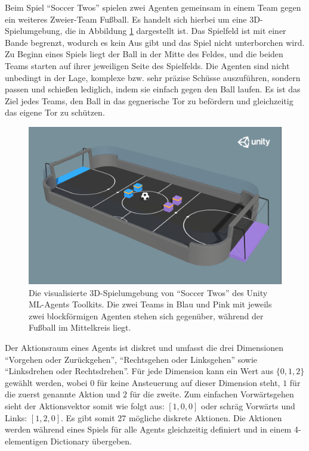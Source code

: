 Beim Spiel ``Soccer Twos'' spielen zwei Agenten gemeinsam in einem Team gegen ein weiteres Zweier-Team Fußball. Es handelt sich hierbei um eine 3D-Spielumgebung, die in Abbildung \ref{fig:soccer_twos_3d} dargestellt ist. Das Spielfeld ist mit einer Bande begrenzt, wodurch es kein Aus gibt und das Spiel nicht unterborchen wird. Zu Beginn eines Spiels liegt der Ball in der Mitte des Feldes, und die beiden Teams starten auf ihrer jeweiligen Seite des Spielfelds. Die Agenten sind nicht unbedingt in der Lage, komplexe bzw. sehr präzise Schüsse auszuführen, sondern passen und schießen lediglich, indem sie einfach gegen den Ball laufen. Es ist das Ziel jedes Teams, den Ball in das gegnerische Tor zu befördern und gleichzeitig das eigene Tor zu schützen.

\begin{figure}[h]
	\centering
	\includegraphics[width=\textwidth]{img/soccer_twos.png}
	\caption{Die visualisierte 3D-Spielumgebung von ``Soccer Twos'' des Unity \ac{ML}-Agents Toolkits. Die zwei Teams in Blau und Pink mit jeweils zwei blockförmigen Agenten stehen sich gegenüber, während der Fußball im Mittelkreis liegt. \cite{juliani2020}}
	\label{fig:soccer_twos_3d}
\end{figure}

Der Aktionsraum eines Agents ist diskret und umfasst die drei Dimensionen ``Vorgehen oder Zurückgehen'', ``Rechtsgehen oder Linksgehen'' sowie ``Linksdrehen oder Rechtsdrehen''. Für jede Dimension kann ein Wert aus \(\{0,1, 2\}\) gewählt werden, wobei \(0\) für keine Ansteuerung auf dieser Dimension steht, \(1\) für die zuerst genannte Aktion und \(2\) für die zweite. Zum einfachen Vorwärtsgehen sieht der Aktionsvektor somit wie folgt aus: \([1, 0, 0]\) oder schräg Vorwärts und Links: \([1, 2, 0]\). Es gibt somit 27 mögliche diskrete Aktionen.
Die Aktionen werden während eines Spiels für alle Agents gleichzeitig definiert und in einem 4-elementigen Dictionary übergeben.

